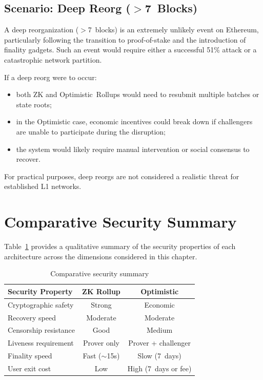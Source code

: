 \documentclass[
]{elteikthesis}[2024/04/26]
\begin{document}
\subsection{Scenario: Deep Reorg ($>$7~Blocks)}

A deep reorganization ($>$7~blocks) is an extremely unlikely event on Ethereum, particularly following the transition to proof-of-stake and the introduction of finality gadgets. Such an event would require either a successful 51\% attack or a catastrophic network partition.

If a deep reorg were to occur:
\begin{itemize}
    \item both ZK and Optimistic~Rollups would need to resubmit multiple batches or state roots;
    \item in the Optimistic case, economic incentives could break down if challengers are unable to participate during the disruption;
    \item the system would likely require manual intervention or social consensus to recover.
\end{itemize}

For practical purposes, deep reorgs are not considered a realistic threat for established L1 networks.

\section{Comparative Security Summary}

Table~\ref{tab:security-summary} provides a qualitative summary of the security properties of each architecture across the dimensions considered in this chapter.

\begin{table}[h]
    \centering
    \begin{tabular}{l|c|c}
        \hline
        \textbf{Security Property} & \textbf{ZK Rollup} & \textbf{Optimistic} \\
        \hline
        Cryptographic safety & Strong & Economic \\
        \hline
        Recovery speed & Moderate & Moderate \\
        \hline
        Censorship resistance & Good & Medium \\
        \hline
        Liveness requirement & Prover only & Prover + challenger \\
        \hline
        Finality speed & Fast ($\sim$15s) & Slow (7~days) \\
        \hline
        User exit cost & Low & High (7~days or fee) \\
        \hline
    \end{tabular}
    \caption{Comparative security summary}
    \label{tab:security-summary}
\end{table}
\end{document}
